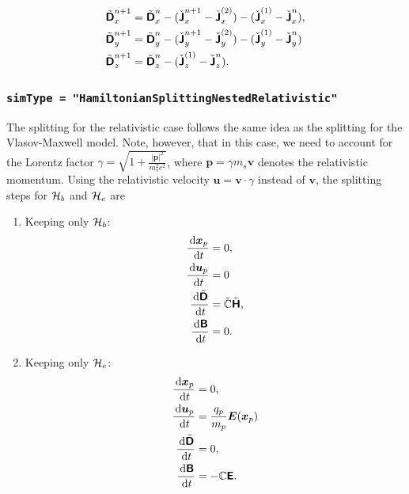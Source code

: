 \documentclass[11pt]{article}
\begin{document}
$$
    \begin{aligned}
        \tilde{{\boldsymbol {\rm \mathsf{D}}}}_x^{n+1} & = \tilde{{\boldsymbol {\rm \mathsf{D}}}}_x^{n} -(\check{{\boldsymbol {\rm \mathsf{J}}}}_x^{n+1}-\check{{\boldsymbol {\rm \mathsf{J}}}}_x^{(2)})
        -(\check{{\boldsymbol {\rm \mathsf{J}}}}_x^{(1)}-\check{{\boldsymbol {\rm \mathsf{J}}}}_x^n),                                                  \\
        \tilde{{\boldsymbol {\rm \mathsf{D}}}}_y^{n+1} & = \tilde{{\boldsymbol {\rm \mathsf{D}}}}_y^{n} -(\check{{\boldsymbol {\rm \mathsf{J}}}}_y^{n+1}-\check{{\boldsymbol {\rm \mathsf{J}}}}_y^{(2)})
        -(\check{{\boldsymbol {\rm \mathsf{J}}}}_y^{(1)}-\check{{\boldsymbol {\rm \mathsf{J}}}}_y^n)                                                   \\
        \tilde{{\boldsymbol {\rm \mathsf{D}}}}_z^{n+1} & = \tilde{{\boldsymbol {\rm \mathsf{D}}}}_z^n -(\check{{\boldsymbol {\rm \mathsf{J}}}}_z^{(1)}-\check{{\boldsymbol {\rm \mathsf{J}}}}_z^n).
    \end{aligned}
$$

\subsubsection{\verb|simType = "HamiltonianSplittingNestedRelativistic"|}
\label{sec:splitting_vlasovmaxwell_rel}
The splitting for the relativistic case follows the same idea as the splitting for the Vlasov-Maxwell model. Note, however, that in this case, we need to account for the Lorentz factor $\gamma = \sqrt{1+\frac{|\pmb{p}|^2}{m_s^2c^2}}$, where $\pmb{p}=\gamma m_s \pmb{v}$ denotes the relativistic momentum.
Using the relativistic velocity $\pmb{u} = \pmb{v} \cdot \gamma$ instead of $\pmb{v}$, the splitting steps for $\mathcal{H}_{b}$ and $\mathcal{H}_{e}$ are


\begin{enumerate}
    \item Keeping only $\mathcal{H}_b$:
          $$
              \begin{aligned}
                  \frac{\, {\rm d} {\boldsymbol x}_p}{\, {\rm d} t}         & = 0,                                \\
                  \frac{\, {\rm d} {\boldsymbol u}_p }{\, {\rm d} t}        & = 0                                 \\
                  \frac{\, {\rm d} \tilde{{\boldsymbol {\rm \mathsf{D}}}}}{\, {\rm d} t} & =  \tilde{\mathbb{C}}\tilde{{\boldsymbol {\rm \mathsf{H}}}}, \\
                  \frac{\, {\rm d} {\boldsymbol {\rm \mathsf{B}}} }{\, {\rm d} t}        & = 0.
              \end{aligned}
          $$
    \item Keeping only $\mathcal{H}_e$:
          $$
              \begin{aligned}
                  \frac{\, {\rm d} {\boldsymbol x}_p}{\, {\rm d} t}       & = 0,                          \\
                  \frac{\, {\rm d} {\boldsymbol u}_p }{\, {\rm d} t}      & = \frac {q_p}{m_p} {\boldsymbol E}({\boldsymbol x}_p) \\
                  \frac{\, {\rm d} \tilde{{\boldsymbol {\rm \mathsf{D}}}}}{\, {\rm d} t} & =  0,                         \\
                  \frac{\, {\rm d} {\boldsymbol {\rm \mathsf{B}}} }{\, {\rm d} t}      & = - \mathbb{C}{\boldsymbol {\rm \mathsf{E}}}.
              \end{aligned}
          $$
\end{enumerate}
\end{document}
